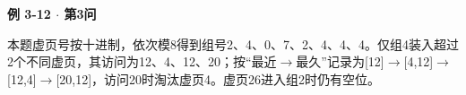 {\color{ink}\bfseries 例 3-12 \(\cdot \) 第3问}\par\vspace{1bp}本题虚页号按十进制，依次模8得到组号2、4、0、7、2、4、4、4。仅组4装入超过2个不同虚页，其访问为12、4、12、20；按“最近\(\to \)最久”记录为[12]\(\to \)[4,\allowbreak{}12]\(\to \)[12,\allowbreak{}4]\(\to \)[20,\allowbreak{}12]，访问20时淘汰虚页4。虚页26进入组2时仍有空位。
